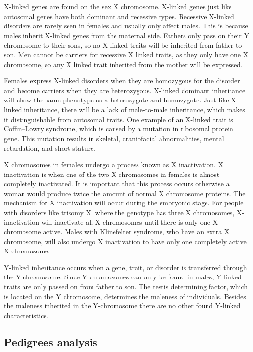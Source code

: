 X-linked genes are found on the sex X chromosome. X-linked genes just like autosomal genes have both dominant and recessive types. Recessive X-linked disorders are rarely seen in females and usually only affect males. This is because males inherit X-linked genes from the maternal side. Fathers only pass on their Y chromosome to their sons, so no X-linked traits will be inherited from father to son. Men cannot be carriers for recessive X linked traits, as they only have one X chromosome, so any X linked trait inherited from the mother will be expressed.

Females express X-linked disorders when they are homozygous for the disorder and become carriers when they are heterozygous. X-linked dominant inheritance will show the same phenotype as a heterozygote and homozygote. Just like X-linked inheritance, there will be a lack of male-to-male inheritance, which makes it distinguishable from autosomal traits. One example of an X-linked trait is \href{https://en.wikipedia.org/wiki/Coffin–Lowry_syndrome}{Coffin--Lowry syndrome}, which is caused by a mutation in ribosomal protein gene. This mutation results in skeletal, craniofacial abnormalities, mental retardation, and short stature.

X chromosomes in females undergo a process known as X inactivation. X inactivation is when one of the two X chromosomes in females is almost completely inactivated. It is important that this process occurs otherwise a woman would produce twice the amount of normal X chromosome proteins. The mechanism for X inactivation will occur during the embryonic stage. For people with disorders like trisomy X, where the genotype has three X chromosomes, X-inactivation will inactivate all X chromosomes until there is only one X chromosome active. Males with Klinefelter syndrome, who have an extra X chromosome, will also undergo X inactivation to have only one completely active X chromosome.

Y-linked inheritance occurs when a gene, trait, or disorder is transferred through the Y chromosome. Since Y chromosomes can only be found in males, Y linked traits are only passed on from father to son. The testis determining factor, which is located on the Y chromosome, determines the maleness of individuals. Besides the maleness inherited in the Y-chromosome there are no other found Y-linked characteristics.

\hypertarget{pedigrees-analysis}{%
\subsection{Pedigrees analysis}\label{pedigrees-analysis}}

